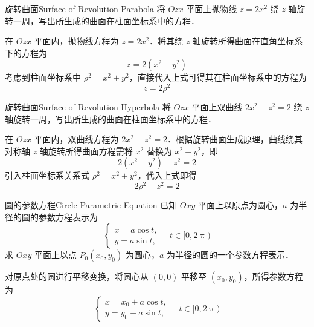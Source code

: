 \begin{problem}{旋转曲面}{Surface-of-Revolution-Parabola}
    将 $Ozx$ 平面上抛物线 $z = 2x^2$ 绕 $z$ 轴旋转一周，写出所生成的曲面在柱面坐标系中的方程．
\end{problem}

\begin{solution}
    在 $Ozx$ 平面内，抛物线方程为 $z = 2x^2$．将其绕 $z$ 轴旋转所得曲面在直角坐标系下的方程为
    \begin{equation}
        z = 2(x^2 + y^2)
    \end{equation}
    考虑到柱面坐标系中 $\rho^2 = x^2 + y^2$，直接代入上式可得其在柱面坐标系中的方程为
    \begin{equation}
        \boxed{z = 2\rho^2}
    \end{equation}
\end{solution}

\begin{problem}{旋转曲面}{Surface-of-Revolution-Hyperbola}
    将 $Ozx$ 平面上双曲线 $2x^2 - z^2 = 2$ 绕 $z$ 轴旋转一周，写出所生成的曲面在柱面坐标系中的方程．
\end{problem}

\begin{solution}
    在 $Ozx$ 平面内，双曲线方程为 $2x^2 - z^2 = 2$．根据旋转曲面生成原理，曲线绕其对称轴 $z$ 轴旋转所得曲面方程需将 $x^2$ 替换为 $x^2 + y^2$，即
    \begin{equation}
        2(x^2 + y^2) - z^2 = 2
    \end{equation}
    引入柱面坐标系关系式 $\rho^2 = x^2 + y^2$，代入上式即得
    \begin{equation}
        \boxed{2\rho^2 - z^2 = 2}
    \end{equation}
\end{solution}


\begin{problem}{圆的参数方程}{Circle-Parametric-Equation}
    已知 $Oxy$ 平面上以原点为圆心，$a$ 为半径的圆的参数方程表示为
    \begin{equation}
        \begin{cases}
            x = a \cos t, \\
            y = a \sin t,
        \end{cases} \quad t \in [0, 2\uppi)
    \end{equation}
    求 $Oxy$ 平面上以点 $P_0(x_0, y_0)$ 为圆心，$a$ 为半径的圆的一个参数方程表示．
\end{problem}

\begin{solution}
    对原点处的圆进行平移变换，将圆心从 $(0, 0)$ 平移至 $(x_0, y_0)$，所得参数方程为
    \begin{equation}
        \boxed{
        \begin{cases}
            x = x_0 + a \cos t, \\
            y = y_0 + a \sin t,
        \end{cases} \quad t \in [0, 2\uppi)
        }
    \end{equation}
\end{solution}


